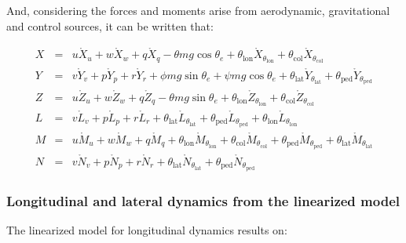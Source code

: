     And, considering the forces and moments arise from aerodynamic, gravitational and control sources, it can be written that:

    \begin{eqnarray}
      X &=& u \mathring{X}_u + w \mathring{X}_w + q \mathring{X}_q - \theta m g \cos \theta_e + \theta_{\mathrm{lon}} \mathring{X}_{\theta_{\mathrm{lon}}} + \theta_{\mathrm{col}} \mathring{X}_{\theta_{\mathrm{col}}} \\[6pt]
      Y &=& v \mathring{Y}_v + p \mathring{Y}_p + r \mathring{Y}_r + \phi m g \sin \theta_e + \psi m g \cos \theta_e + \theta_{\mathrm{lat}} \mathring{Y}_{\theta_{\mathrm{lat}}} + \theta_{\mathrm{ped}} \mathring{Y}_{\theta_{\mathrm{ped}}} \\[6pt]
      Z &=& u \mathring{Z}_u + w \mathring{Z}_w + q \mathring{Z}_q - \theta m g \sin \theta_e + \theta_{\mathrm{lon}} \mathring{Z}_{\theta_{\mathrm{lon}}} + \theta_{\mathrm{col}} \mathring{Z}_{\theta_{\mathrm{col}}} \\[6pt]
      L &=& v \mathring{L}_v + p \mathring{L}_p + r \mathring{L}_r + \theta_{\mathrm{lat}} \mathring{L}_{\theta_{\mathrm{lat}}} + \theta_{\mathrm{ped}} \mathring{L}_{\theta_{\mathrm{ped}}} + \theta_{\mathrm{lon}} \mathring{L}_{\theta_{\mathrm{lon}}}\\[6pt] %
      M &=& u \mathring{M}_u + w \mathring{M}_w + q \mathring{M}_q + \theta_{\mathrm{lon}} \mathring{M}_{\theta_{\mathrm{lon}}} + \theta_{\mathrm{col}} \mathring{M}_{\theta_{\mathrm{col}}} + \theta_{\mathrm{ped}} \mathring{M}_{\theta_{\mathrm{ped}}} + \theta_{\mathrm{lat}} \mathring{M}_{\theta_{\mathrm{lat}}}\\[6pt] %
      N &=& v \mathring{N}_v + p \mathring{N}_p + r \mathring{N}_r + \theta_{\mathrm{lat}} \mathring{N}_{\theta_{\mathrm{lat}}} + \theta_{\mathrm{ped}} \mathring{N}_{\theta_{\mathrm{ped}}}
    \end{eqnarray}

  \subsubsection{Longitudinal and lateral dynamics from the linearized model}

    The linearized model for longitudinal dynamics results on:

